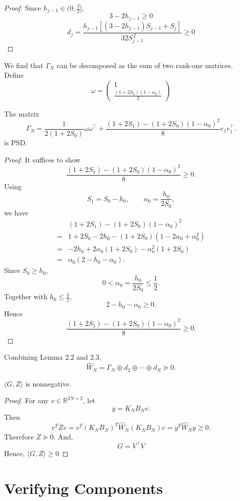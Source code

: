 \begin{proof}
Since $h_{j-1}\in (0,\frac{3}{2}]$,
\[3-2h_{j-1}\ge 0\]
\[d_j=\frac{
h_{j-1}
\left[
(3-2h_{j-1})S_{j-1}+S_j
\right]
}{
32S_{j-1}^{\,2}
} \ge 0\]
\end{proof}
We find that $\Gamma_N$ can be decomposed as the sum of two rank-one matrices.\\
Define
\[\omega=\begin{pmatrix}
    1\\
    \frac{(1+2S_0)(1-\alpha_0)}{2}
\end{pmatrix}\]
\begin{lemma}
The matrix
\[
\Gamma_N=
\frac{1}{2(1+2S_0)}
\omega\omega^\top
+
\frac{
(1+2S_1)-(1+2S_0)(1-\alpha_0)^2
}{8}
e_1e_1^\top.
\]
is PSD.
\end{lemma}

\begin{proof}
It suffices to show
\[
\frac{
(1+2S_1)-(1+2S_0)(1-\alpha_0)^2
}{8}\ge 0.
\]
Using
\[
S_1=S_0-h_0,
\qquad
\alpha_0=\frac{h_0}{2S_0},
\]
we have
\[
\begin{aligned}
&(1+2S_1)-(1+2S_0)(1-\alpha_0)^2\\
={}&
1+2S_0-2h_0
-(1+2S_0)(1-2\alpha_0+\alpha_0^2)\\
={}&
-2h_0+2\alpha_0(1+2S_0)
-\alpha_0^2(1+2S_0)\\
={}&
\alpha_0(2-h_0-\alpha_0).
\end{aligned}
\]
Since \(S_0\ge h_0\),
\[
0<\alpha_0=\frac{h_0}{2S_0}\le\frac12.
\]
Together with \(h_0\le\frac32\),
\[
2-h_0-\alpha_0\ge 0.
\]
Hence
\[
\frac{
(1+2S_1)-(1+2S_0)(1-\alpha_0)^2
}{8}\ge 0.
\]
\end{proof}

Combining Lemma $2.2$ and $2.3$,
\[
\widehat{W}_N
=\Gamma_N\oplus d_2\oplus\cdots\oplus d_N\succeq 0.
\]

\begin{theorem}
$\langle G,Z \rangle $ is nonnegative.
\end{theorem}

\begin{proof}
For any \(v\in\mathbb{R}^{2N+2}\), let
\[
y=K_NB_Nv.
\]
Then
\[
v^TZv
=v^T(K_NB_N)^T\widehat{W}_N(K_NB_N)v
=y^T\widehat{W}_Ny\geq 0.
\]
Therefore \(Z\succeq 0\).
And,
\[G= V^{\top}V\]
Hence, $\langle G,Z \rangle \ge 0$
\end{proof}

\section{Verifying Components}

